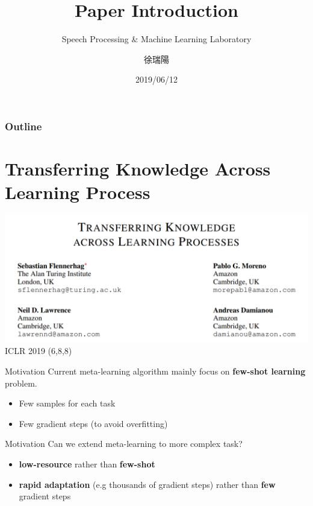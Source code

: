\documentclass{beamer}
\title{Paper Introduction}
\subtitle{\textcolor[rgb]{0.00,0.50,1.00}{{Speech Processing \& Machine Learning Laboratory}}}
\author{徐瑞陽}
\date{2019/06/12}
\begin{document}
\begin{frame}
\maketitle
\end{frame}

\begin{frame}
\frametitle{Outline}
\tableofcontents
\end{frame}


\section{Transferring Knowledge Across Learning Process}
\begin{frame}
  \includegraphics[width=\textwidth]{fig/p1-title.png}
  \center ICLR 2019
  \center (6,8,8)
\end{frame}

\begin{frame}{Motivation}
  Current meta-learning algorithm mainly focus on \textbf{few-shot learning} problem. 
  \begin{itemize}
    \item Few samples for each task
    \item Few gradient steps (to avoid overfitting)
  \end{itemize}
\end{frame}

\begin{frame}{Motivation}
  Can we extend meta-learning to more complex task?
  \begin{itemize}
    \item \textbf{low-resource} rather than \textbf{few-shot}
    \item \textbf{rapid adaptation} (e.g thousands of gradient steps) rather than \textbf{few} gradient steps
  \end{itemize}
\end{frame}
\end{document}
